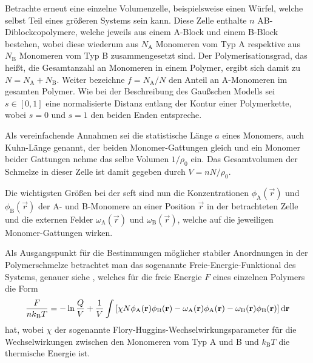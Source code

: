 Betrachte erneut eine einzelne Volumenzelle, beispielsweise einen Würfel, welche selbst Teil eines größeren Systems sein kann.
Diese Zelle enthalte $n$ AB-Diblockcopolymere, welche jeweils aus einem A-Block und einem B-Block bestehen, wobei diese wiederum aus $N_{\mathrm{A}}$ Monomeren vom Typ A respektive aus $N_{\mathrm{B}}$ Monomeren vom Typ B zusammengesetzt sind.
Der Polymerisationsgrad, das heißt, die Gesamtanzahl an Monomeren in einem Polymer, ergibt sich damit zu $N = N_{\mathrm{A}} + N_{\mathrm{B}}$.
Weiter bezeichne $f = N_{\mathrm{A}} / N$ den Anteil an A-Monomeren im gesamten Polymer.
Wie bei der Beschreibung des Gaußschen Modells sei $s \in [0, 1]$ eine normalisierte Distanz entlang der Kontur einer Polymerkette, wobei $s = 0$ und $s = 1$ den beiden Enden entspreche.

Als vereinfachende Annahmen sei die statistische Länge $a$ eines Monomers, auch Kuhn-Länge genannt, der beiden Monomer-Gattungen gleich und ein Monomer beider Gattungen nehme das selbe Volumen $1 / \rho_{0}$ ein.
Das Gesamtvolumen der Schmelze in dieser Zelle ist damit gegeben durch $V = n N / \rho_{0}$.

Die wichtigsten Größen bei der \ac{scft} sind nun die Konzentrationen $\phi_{\mathrm{A}}(\vec{r})$ und $\phi_{\mathrm{B}}(\vec{r})$ der A- und B-Monomere an einer Position $\vec{r}$ in der betrachteten Zelle und die externen Felder $\omega_{\mathrm{A}}(\vec{r})$ und $\omega_{\mathrm{B}}(\vec{r})$, welche auf die jeweiligen Monomer-Gattungen wirken.

Als Ausgangspunkt für die Bestimmungen möglicher stabiler Anordnungen in der Polymerschmelze betrachtet man das sogenannte Freie-Energie-Funktional des Systems, genauer siehe \cite{Matsen:2006ud,Fredrickson:2006th}, welches für die freie Energie $F$ eines einzelnen Polymers die Form
\begin{equation}
\label{eq:freie_energie_funktional}
    \frac{F}{nk_{\mathrm{B}}T} = - \ln \frac{Q}{V} + \frac{1}{V} \int \left[ \chi N \phi_{\mathrm{A}}(\mathbf{r}) \phi_{\mathrm{B}}(\mathbf{r}) - \omega_{\mathrm{A}}(\mathbf{r}) \phi_{\mathrm{A}}(\mathbf{r}) - \omega_{\mathrm{B}}(\mathbf{r}) \phi_{\mathrm{B}}(\mathbf{r}) \right] \mathop{}\!\mathrm{d} \mathbf{r}
\end{equation}
hat, wobei $\chi$ der sogenannte Flory-Huggins-Wechselwirkungsparameter für die Wechselwirkungen zwischen den Monomeren vom Typ A und B und $k_{\mathrm{B}} T$ die thermische Energie ist.

